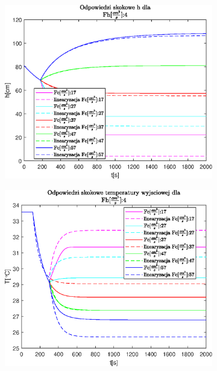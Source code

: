 \begin{figure}[h!]
   \centering
   \begin{subfigure}[b]{0.6\textwidth}
      \includegraphics[width=1\linewidth]{img/step-responses/stepResponseHFh4.eps}
      \caption{}
      \label{fig:fig:stepResponsesFh41}
   \end{subfigure}
       
   \begin{subfigure}[b]{0.6\textwidth}
      \includegraphics[width=1\linewidth]{img/step-responses/stepResponseToutFh4.eps}
      \caption{}
      \label{fig:fig:stepResponsesFh42}
   \end{subfigure}
       

\end{figure}
